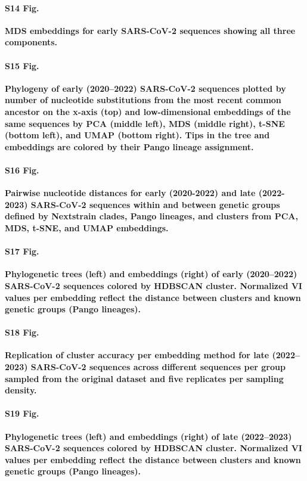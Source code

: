 \documentclass[10pt,letterpaper]{article}
\begin{document}
\paragraph*{S14 Fig.}
\label{S_Fig_sarscov2_early_mds}
{\bf MDS embeddings for early SARS-CoV-2 sequences showing all three components.}

\paragraph*{S15 Fig.}
\label{S_Fig_sarscov2_early_embeddings_by_Nextclade_pango}
{\bf Phylogeny of early (2020--2022) SARS-CoV-2 sequences plotted by number of nucleotide substitutions from the most recent common ancestor on the x-axis (top) and low-dimensional embeddings of the same sequences by PCA (middle left), MDS (middle right), t-SNE (bottom left), and UMAP (bottom right).
  Tips in the tree and embeddings are colored by their Pango lineage assignment.}

\paragraph*{S16 Fig.}
\label{S_Fig_sarscov2_within_between_group_distances}
{\bf Pairwise nucleotide distances for early (2020-2022) and late (2022-2023) SARS-CoV-2 sequences within and between genetic groups defined by Nextstrain clades, Pango lineages, and clusters from PCA, MDS, t-SNE, and UMAP embeddings.}

\paragraph*{S17 Fig.}
\label{S_Fig_sarscov2_early_embeddings_by_cluster_vs_Nextclade_pango}
{\bf Phylogenetic trees (left) and embeddings (right) of early (2020--2022) SARS-CoV-2 sequences colored by HDBSCAN cluster.
  Normalized VI values per embedding reflect the distance between clusters and known genetic groups (Pango lineages).}

\paragraph*{S18 Fig.}
\label{S_Fig_late_sarscov2_replication_of_cluster_accuracy}
{\bf Replication of cluster accuracy per embedding method for late (2022--2023) SARS-CoV-2 sequences across different sequences per group sampled from the original dataset and five replicates per sampling density.}

\paragraph*{S19 Fig.}
\label{S_Fig_sarscov2_late_embeddings_by_cluster_vs_Nextclade_pango}
{\bf Phylogenetic trees (left) and embeddings (right) of late (2022--2023) SARS-CoV-2 sequences colored by HDBSCAN cluster.
  Normalized VI values per embedding reflect the distance between clusters and known genetic groups (Pango lineages).}
\end{document}
